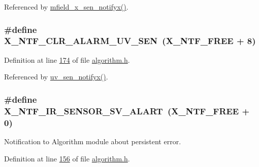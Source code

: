 Referenced by \hyperlink{a00050_source_l00107}{mfield\+\_\+x\+\_\+sen\+\_\+notifyx()}.

\hypertarget{a00021_a1127762abb3a1aeb79d23421b2f00493}{
\subsubsection[{X\+\_\+\+N\+T\+F\+\_\+\+C\+L\+R\+\_\+\+A\+L\+A\+R\+M\+\_\+\+U\+V\+\_\+\+S\+E\+N}]{\setlength{\rightskip}{0pt plus 5cm}\#define X\+\_\+\+N\+T\+F\+\_\+\+C\+L\+R\+\_\+\+A\+L\+A\+R\+M\+\_\+\+U\+V\+\_\+\+S\+E\+N~({\bf X\+\_\+\+N\+T\+F\+\_\+\+F\+R\+E\+E} + 8)}}\label{a00021_a1127762abb3a1aeb79d23421b2f00493}


Definition at line \hyperlink{a00021_source_l00174}{174} of file \hyperlink{a00021_source}{algorithm.\+h}.



Referenced by \hyperlink{a00073_source_l00141}{uv\+\_\+sen\+\_\+notifyx()}.

\hypertarget{a00021_a0eb06525326cff5fc0fb38f141d6be8e}{
\subsubsection[{X\+\_\+\+N\+T\+F\+\_\+\+I\+R\+\_\+\+S\+E\+N\+S\+O\+R\+\_\+\+S\+V\+\_\+\+A\+L\+A\+R\+T}]{\setlength{\rightskip}{0pt plus 5cm}\#define X\+\_\+\+N\+T\+F\+\_\+\+I\+R\+\_\+\+S\+E\+N\+S\+O\+R\+\_\+\+S\+V\+\_\+\+A\+L\+A\+R\+T~({\bf X\+\_\+\+N\+T\+F\+\_\+\+F\+R\+E\+E} + 0)}}\label{a00021_a0eb06525326cff5fc0fb38f141d6be8e}


Notification to Algorithm module about persistent error. 



Definition at line \hyperlink{a00021_source_l00156}{156} of file \hyperlink{a00021_source}{algorithm.\+h}.



